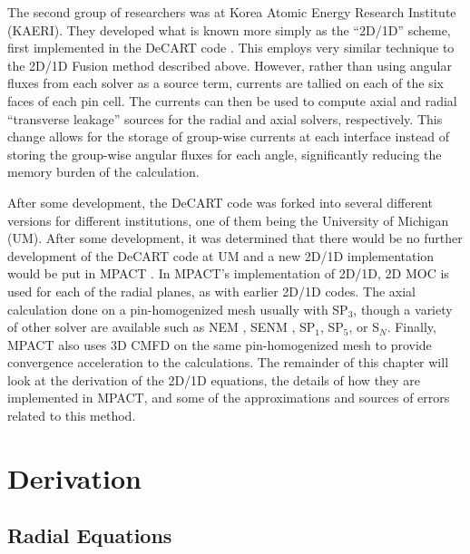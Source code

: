 The second group of researchers was at Korea Atomic Energy Research Institute (KAERI).  They developed what is known more simply as the ``2D/1D'' scheme, first implemented in the DeCART code \cite{3DHetWholeCoreTransPlanarMOC,DeCARTTheoryManual,MethodsAndPerformanceOfDecart}.  This employs very similar technique to the 2D/1D Fusion method described above.  However, rather than using angular fluxes from each solver as a source term, currents are tallied on each of the six faces of each pin cell.  The currents can then be used to compute axial and radial ``transverse leakage'' sources for the radial and axial solvers, respectively.  This change allows for the storage of group-wise currents at each interface instead of storing the group-wise angular fluxes for each angle, significantly reducing the memory burden of the calculation.

After some development, the DeCART code was forked into several different versions for different institutions, one of them being the University of Michigan (UM).  After some development, it was determined that there would be no further development of the DeCART code at UM and a new 2D/1D implementation would be put in MPACT \cite{2D1DApproxTo3DTransport1,StabilityAndAccuracyOf3DTransportInMPACT}.  In MPACT's implementation of 2D/1D, 2D MOC is used for each of the radial planes, as with earlier 2D/1D codes.  The axial calculation done on a pin-homogenized mesh usually with SP$_3$, though a variety of other solver are available such as NEM , SENM , SP$_1$, SP$_5$, or S$_N$.  Finally, MPACT also uses 3D CMFD on the same pin-homogenized mesh to provide convergence acceleration to the calculations.  The remainder of this chapter will look at the derivation of the 2D/1D equations, the details of how they are implemented in MPACT, and some of the approximations and sources of errors related to this method.

\section{Derivation}

\subsection{Radial Equations}\label{ss:2d1dradialEq}

